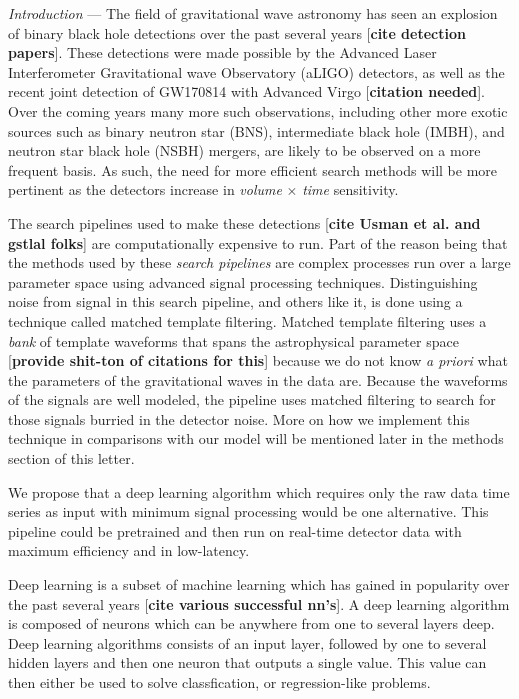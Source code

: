 \documentclass[%
 amsmath,amssymb,
 aps,
 twocolumn,
]{revtex4-1}
\begin{document}
\textit{Introduction} --- The field of gravitational wave astronomy has seen an explosion of binary black hole detections over the past several years [\textbf{cite detection papers}]. These detections were made possible by the Advanced Laser Interferometer Gravitational wave Observatory (aLIGO) detectors, as well as the recent joint detection of GW170814 with Advanced Virgo [\textbf{citation needed}]. Over the coming years many more such observations, including other more exotic sources such as binary neutron star (BNS), intermediate black hole (IMBH), and neutron star black hole (NSBH) mergers, are likely to be observed on a more frequent basis. As such, the need for more efficient search methods will be more pertinent as the detectors increase in \textit{volume} $\times$ \textit{time} sensitivity.

The search pipelines used to make these detections [\textbf{cite Usman et al. and gstlal folks}] are computationally expensive to run. Part of the reason being that the methods used by these \textit{search pipelines} are complex processes run over a large parameter space using advanced signal processing techniques. Distinguishing noise from signal in this search pipeline, and others like it, is done using a technique called matched template filtering. Matched template filtering uses a \textit{bank} of template waveforms that spans the astrophysical parameter space [\textbf{provide shit-ton of citations for this}] because we do not know \textit{a priori} what the parameters of the gravitational waves in the data are. Because the waveforms of the signals are well modeled, the pipeline uses matched filtering to search for those signals burried in the detector noise. More on how we implement this technique in comparisons with our model will be mentioned later in the methods section of this letter.

We propose that a deep learning algorithm which requires only the raw data time series as input with minimum signal processing would be one alternative. This pipeline could be pretrained and then run on real-time detector data with maximum efficiency and in low-latency.

Deep learning is a subset of machine learning which has gained in popularity over the past several years [\textbf{cite various successful nn's}]. A deep learning algorithm is composed of neurons which can be anywhere from one to several layers deep. Deep learning algorithms consists of an input layer, followed by one to several hidden layers and then one neuron that outputs a single value. This value can then either be used to solve classfication, or regression-like problems. 
\end{document}
